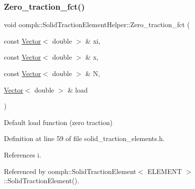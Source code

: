 \subsubsection{\texorpdfstring{Zero\+\_\+traction\+\_\+fct()}{Zero\_traction\_fct()}}
{\footnotesize\ttfamily void oomph\+::\+Solid\+Traction\+Element\+Helper\+::\+Zero\+\_\+traction\+\_\+fct (\begin{DoxyParamCaption}\item[{const \hyperlink{classoomph_1_1Vector}{Vector}$<$ double $>$ \&}]{xi,  }\item[{const \hyperlink{classoomph_1_1Vector}{Vector}$<$ double $>$ \&}]{x,  }\item[{const \hyperlink{classoomph_1_1Vector}{Vector}$<$ double $>$ \&}]{N,  }\item[{\hyperlink{classoomph_1_1Vector}{Vector}$<$ double $>$ \&}]{load }\end{DoxyParamCaption})}



Default load function (zero traction) 



Definition at line 59 of file solid\+\_\+traction\+\_\+elements.\+h.



References i.



Referenced by oomph\+::\+Solid\+Traction\+Element$<$ E\+L\+E\+M\+E\+N\+T $>$\+::\+Solid\+Traction\+Element().

